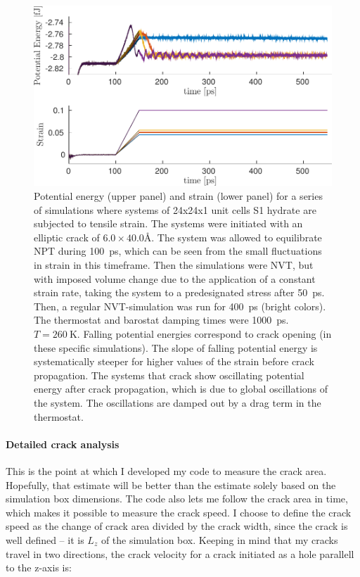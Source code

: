 \begin{figure}
\includegraphics[width=\textwidth]{../figures/thesis/proof_of_concept_poteng_strain.pdf}
\caption{Potential energy (upper panel) and strain (lower panel) for a series of simulations where systems of 24x24x1 unit cells S1 hydrate are subjected to tensile strain. The systems were initiated with an elliptic crack of $6.0 \times 40.0 \si{\angstrom}$. The system was allowed to equilibrate NPT during \SI{100}{\pico\second}, which can be seen from the small fluctuations in strain in this timeframe. Then the simulations were NVT, but with imposed volume change due to the application of a constant strain rate, taking the system to a predesignated stress after \SI{50}{\pico\second}. Then, a regular NVT-simulation was run for \SI{400}{\pico\second} (bright colors). The thermostat and barostat damping times were \SI{1000}{\pico\second}. $T=\SI{260}{\kelvin}$. Falling potential energies correspond to crack opening (in these specific simulations). The slope of falling potential energy is systematically steeper for higher values of the strain before crack propagation. The systems that crack show oscillating potential energy after crack propagation, which is due to global oscillations of the system. The oscillations are damped out by a drag term in the thermostat. }
\label{fig:proof_of_concept_crack}
\end{figure}

\paragraph{Detailed crack analysis}
This is the point at which I developed my code to measure the crack area. Hopefully, that estimate will be better than the estimate solely based on the simulation box dimensions. The code also lets me follow the crack area in time, which makes it possible to measure the crack speed. I choose to define the crack speed as the change of crack area divided by the crack width, since the crack is well defined – it is $L_z$ of the simulation box. Keeping in mind that my cracks travel in two directions, the crack velocity for a crack initiated as a hole parallell to the z-axis is:

